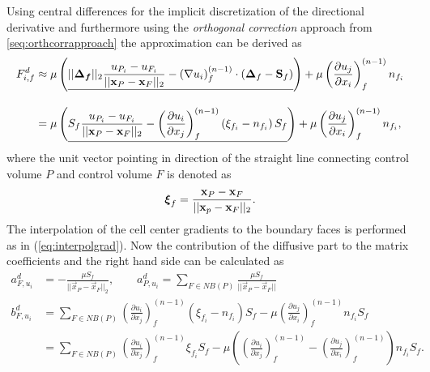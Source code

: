       Using central differences for the implicit discretization of the directional derivative and furthermore using the \emph{orthogonal correction} approach from \ref{seq:orthcorrapproach} the approximation can be derived as
      \begin{align*}
        F_{i,f}^d 
        &\approx 
        \mu \left( \underline{||\boldsymbol{\boldsymbol{\Delta}_f}||_2 \frac{u_{P_i} - u_{F_i}}{ || \mathbf{x}_P - \mathbf{x}_F ||_2 }  
        -  \left(\nabla u_i \right)_f^{(n-1)} \cdot \left(\boldsymbol{\Delta}_f - \mathbf{S}_f\right)  }  \right)
        + \mu \left( \frac{\partial u_j}{\partial x_i} \right)_f^{(n-1)} n_{f_i} \\[1em]
        &= \mu \left(\underline{  S_f \frac{u_{P_i} - u_{F_i}}{ || \mathbf{x}_P - \mathbf{x}_F ||_2 }  
    - \left( \frac{\partial u_i}{\partial x_j}\right)_f^{(n-1)} \left(\xi_{f_i} - n_{f_i}\right)S_f  } \right)
      + \mu \left( \frac{\partial u_j}{\partial x_i} \right)_f^{(n-1)} n_{f_i},
    \end{align*}
      where the unit vector pointing in direction of the straight line connecting control volume \(P\) and control volume \(F\) is denoted as
      \begin{displaymath}
        \boldsymbol{\xi}_f = \frac{\mathbf{x}_P - \mathbf{x}_F}{|| \mathbf{x}_p - \mathbf{x}_F ||_2}.
      \end{displaymath}
      The interpolation of the cell center gradients to the boundary faces is performed as in (\ref{eq:interpolgrad}). Now the contribution of the diffusive part to the matrix coefficients and the right hand side can be calculated as
      \begin{subequations}
        \begin{align}
          a_{F,u_i}^d &= - \frac{\mu S_f}{||\vec{x}_P - \vec{x}_F||_2}, 
          \quad \quad a_{P,u_i}^d = \sum_{F \in NB(P)} \frac{\mu S_f}{|| \vec{x}_P - \vec{x}_F ||} \\[1em]
          b_{F,u_i}^d &=  \sum_{F \in NB(P)} \left( \frac{\partial u_i}{\partial x_j}\right)_f^{(n-1)} \left(\xi_{f_i} - n_{f_i}\right)S_f  
          - \mu \left( \frac{\partial u_j}{\partial x_i} \right)_f^{(n-1)} n_{f_i} S_f   \nonumber \\[0.5em]
          &=  \sum_{F \in NB(P)} \left( \frac{\partial u_i}{\partial x_j}\right)_f^{(n-1)} \xi_{f_i} S_f
          - \mu \left( \left( \frac{\partial u_i}{\partial x_j} \right)_f^{(n-1)}
          - \left( \frac{\partial u_j}{\partial x_i} \right)_f^{(n-1)} \right) n_{f_i} S_f.
        \end{align}
      \end{subequations}


